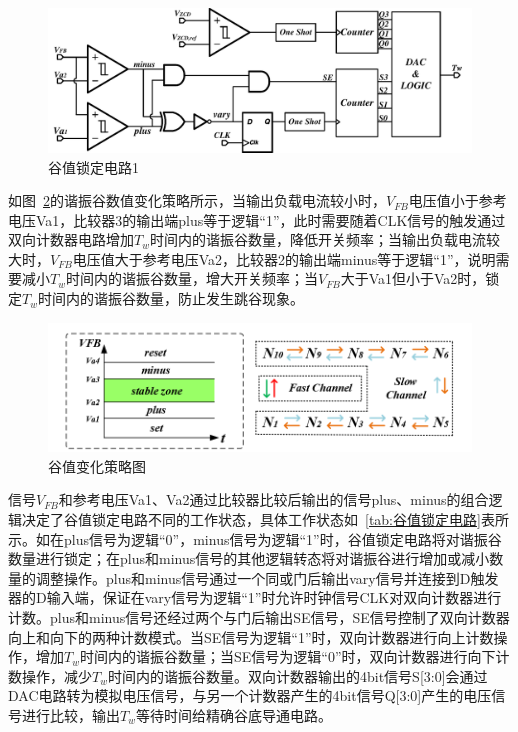 \begin{figure}[htbp] 
    \centering
    \includegraphics[width=0.8\linewidth]{figures/谷值锁定电路1.pdf}
    \caption{谷值锁定电路1}
    \label{fig:谷值锁定电路1}
\end{figure} 

如图~\ref{fig:谷值变化策略}的谐振谷数值变化策略所示，当输出负载电流较小时，$V_{FB}$电压值小于参考电压Va1，比较器3的输出端plus等于逻辑“1”，此时需要随着CLK信号的触发通过双向计数器电路增加$T_w$时间内的谐振谷数量，降低开关频率；当输出负载电流较大时，$V_{FB}$电压值大于参考电压Va2，比较器2的输出端minus等于逻辑“1”，说明需要减小$T_w$时间内的谐振谷数量，增大开关频率；当$V_{FB}$大于Va1但小于Va2时，锁定$T_w$时间内的谐振谷数量，防止发生跳谷现象。

\begin{figure}[htbp] 
    \centering
    \includegraphics[width=0.8\linewidth]{figures/谷值变化策略.png}
    \caption{谷值变化策略图}
    \label{fig:谷值变化策略}
\end{figure} 

信号$V_{FB}$和参考电压Va1、Va2通过比较器比较后输出的信号plus、minus的组合逻辑决定了谷值锁定电路不同的工作状态，具体工作状态如~\ref{tab:谷值锁定电路}表所示。如在plus信号为逻辑“0”，minus信号为逻辑“1”时，谷值锁定电路将对谐振谷数量进行锁定；在plus和minus信号的其他逻辑转态将对谐振谷进行增加或减小数量的调整操作。plus和minus信号通过一个同或门后输出vary信号并连接到D触发器的D输入端，保证在vary信号为逻辑“1”时允许时钟信号CLK对双向计数器进行计数。plus和minus信号还经过两个与门后输出SE信号，SE信号控制了双向计数器向上和向下的两种计数模式。当SE信号为逻辑“1”时，双向计数器进行向上计数操作，增加$T_w$时间内的谐振谷数量；当SE信号为逻辑“0”时，双向计数器进行向下计数操作，减少$T_w$时间内的谐振谷数量。双向计数器输出的4bit信号S[3:0]会通过DAC电路转为模拟电压信号，与另一个计数器产生的4bit信号Q[3:0]产生的电压信号进行比较，输出$T_w$等待时间给精确谷底导通电路。

